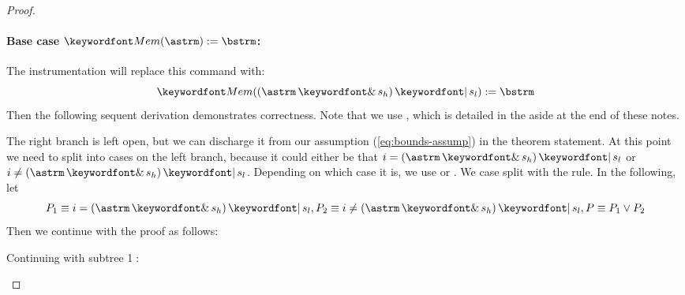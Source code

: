 \documentclass[11pt,twoside]{scrartcl}
\begin{document}
\begin{proof}
\paragraph{\textbf{Base case} $\pderef{\astrm}:=\bstrm$:} 
The instrumentation will replace this command with: 
\[
  \pderef{(\astrm \bitand s_h) \bitor s_l}:=\bstrm
\]
Then the following sequent derivation demonstrates correctness. Note that we use , which is detailed in the aside at the end of these notes.
\begin{sequentdeduction}
 {
}
\end{sequentdeduction}
The right branch is left open, but we can discharge it from our assumption (\ref{eq:bounds-assump}) in the theorem statement.
At this point we need to split into cases on the left branch, because it could either be that $i = (\astrm \bitand s_h) \bitor s_l$ or $i \ne (\astrm \bitand s_h) \bitor s_l$. Depending on which case it is, we use  or . We case split with the  rule. In the following, let
\[
P_1 \equiv i = (\astrm \bitand s_h) \bitor s_l, P_2 \equiv i \ne(\astrm \bitand s_h) \bitor s_l, P \equiv P_1 \lor P_2
\]
Then we continue with the proof as follows:
\begin{sequentdeduction}
 {
}
\end{sequentdeduction}
Continuing with subtree \textcircled{1}:
\begin{sequentdeduction}

\end{sequentdeduction}
\end{proof}
\end{document}
